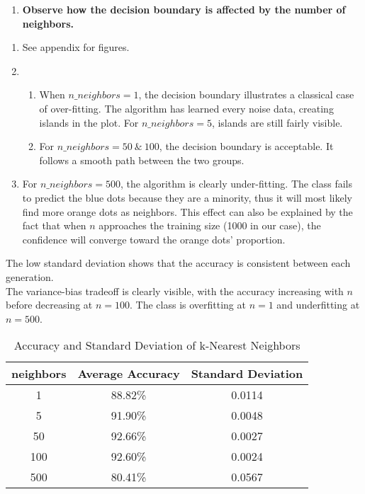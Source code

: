 \documentclass[acmconf,nonacm=true]{acmart}
\begin{document}
\begin{enumerate}
    \item \textbf{Observe how the decision boundary is affected by the number of neighbors.}
\end{enumerate}
    \begin{enumerate}
    \item See appendix for figures.
    \item 
        \begin{enumerate}
            \item When $n\_neighbors = 1$, the decision boundary illustrates a classical case of over-fitting. The algorithm has learned every noise data, creating islands in the plot. For $n\_neighbors = 5$, islands are still fairly visible.
            \item For $n\_neighbors = 50\ \&\ 100$, the decision boundary is acceptable. It follows a smooth path between the two groups.
        \end{enumerate}
    \item For $n\_neighbors = 500$, the algorithm is clearly under-fitting. The class fails to predict the blue dots because they are a minority, thus it will most likely find more orange dots as neighbors. This effect can also be explained by the fact that when $n$ approaches the training size (1000 in our case), the confidence will converge toward the orange dots' proportion.
    \end{enumerate}
    
The low standard deviation shows that the accuracy is consistent between each generation.\\
The variance-bias tradeoff is clearly visible, with the accuracy increasing with $n$ before decreasing at $n=100$. The class is overfitting at $n=1$ and underfitting at $n=500$.

    \begin{table}[H]
    \centering
    \caption{Accuracy and Standard Deviation of k-Nearest Neighbors}
    \begin{tabular}{|c|c|c|}
    \hline
     neighbors & Average Accuracy & Standard Deviation \\
    \hline
    1 & 88.82\% & 0.0114 \\
    5 & 91.90\% & 0.0048 \\
    50 & 92.66\% & 0.0027 \\
    100 & 92.60\% & 0.0024 \\
    500 & 80.41\% & 0.0567 \\
    \hline
    \end{tabular}
    \end{table}
\end{document}
